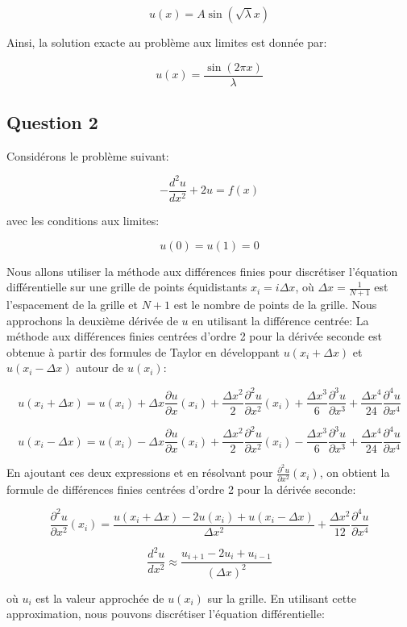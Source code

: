 \documentclass{article}
\begin{document}
$$u(x) = A\sin(\sqrt{\lambda} x)$$

Ainsi, la solution exacte au problème aux limites est donnée par:

$$u(x) = \frac{\sin(2\pi x)}{\lambda}$$

\subsection{Question 2}
Considérons le problème suivant:

$$-\frac{d^2u}{dx^2} + 2u = f(x)$$

avec les conditions aux limites:

$$u(0) = u(1) = 0$$

Nous allons utiliser la méthode aux différences finies pour discrétiser l'équation différentielle sur une grille de points équidistants $x_i = i\Delta x$, où $\Delta x = \frac{1}{N+1}$ est l'espacement de la grille et $N+1$ est le nombre de points de
la grille. \newline
\newline
Nous approchons la deuxième dérivée de $u$ en utilisant la différence centrée:
La méthode aux différences finies centrées d'ordre 2 pour la dérivée seconde est
obtenue à partir des formules de Taylor en développant $u(x_i + \Delta x)$ et
$u(x_i - \Delta x)$ autour de $u(x_i)$:

$$u(x_i+\Delta x) = u(x_i) + \Delta x\frac{\partial u}{\partial x}(x_i) + \frac{\Delta x^2}{2}\frac{\partial^2 u}{\partial x^2}(x_i) + \frac{\Delta x^3}{6}\frac{\partial^3 u}{\partial x^3} + \frac{\Delta x^4}{24}\frac{\partial^4 u}{\partial x^4}$$

$$u(x_i-\Delta x) = u(x_i) - \Delta x\frac{\partial u}{\partial x}(x_i) + \frac{\Delta x^2}{2}\frac{\partial^2 u}{\partial x^2}(x_i) - \frac{\Delta x^3}{6}\frac{\partial^3 u}{\partial x^3} + \frac{\Delta x^4}{24}\frac{\partial^4 u}{\partial x^4}$$

En ajoutant ces deux expressions et en résolvant pour $\frac{\partial^2 u}{\partial x^2}(x_i)$, on obtient la formule de différences finies centrées d'ordre 2 pour la dérivée seconde:

$$\frac{\partial^2 u}{\partial x^2}(x_i) = \frac{u(x_i+\Delta x) - 2u(x_i) + u(x_i-\Delta x)}{\Delta x^2} + \frac{\Delta x^2}{12}\frac{\partial^4 u}{\partial x^4}$$

$$\frac{d^2u}{dx^2} \approx \frac{u_{i+1}-2u_i+u_{i-1}}{(\Delta x)^2}$$

où $u_i$ est la valeur approchée de $u(x_i)$ sur la grille. En utilisant cette approximation, nous pouvons discrétiser l'équation différentielle:
\end{document}
